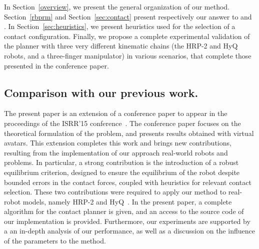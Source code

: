 In Section~\ref{overview}, we present the general organization of our method. Section~\ref{rbprm} and Section~\ref{sec:contact} present respectively our answer to \Pa and \Pb. In Section~\ref{sec:heuristics}, we present heuristics used for the selection of a contact configuration. Finally, we propose a complete experimental validation of the planner with three very different kinematic chains (the HRP-2 and HyQ robots, and a three-finger manipulator) in various scenarios,
that complete those presented in the conference paper.
\subsection*{Comparison with our previous work.}
The present paper is an extension of a conference paper to appear in the proceedings of the ISRR'15 conference~\citep{tonneauisrr15}.
The conference paper focuses on the theoretical formulation of the problem, and presents results obtained with virtual avatars.
This extension completes this work and brings new contributions, resulting from the implementation of our approach real-world robots and problems.
In particular, a strong contribution is the introduction of a robust equilibrium criterion, designed to ensure the equilibrium of the robot despite bounded errors in the contact forces, coupled
with heuristics for relevant contact selection. These two contributions were required to apply our method to real-robot models, namely HRP-2 and HyQ~\citep{semini11hyqdesignjsce}.
In the present paper, a complete algorithm for the contact planner is given, and an access to the source code of our implementation is provided.
Furthermore, our experiments are supported by a an in-depth analysis of our performance, as well as a discussion on the influence of the parameters to the method.

